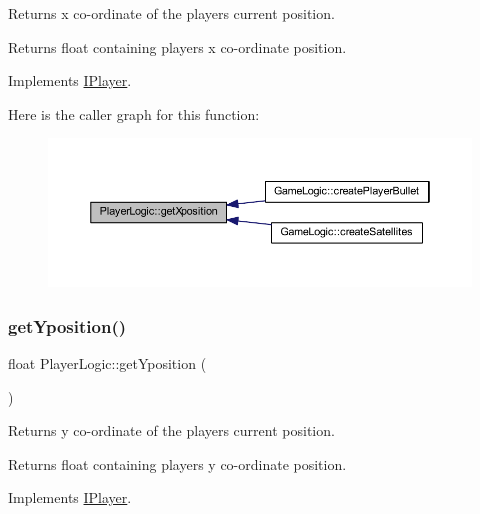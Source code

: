 Returns x co-\/ordinate of the player\textquotesingle{}s current position. 

\begin{DoxyReturn}{Returns}
float containing players x co-\/ordinate position. 
\end{DoxyReturn}


Implements \hyperlink{class_i_player_a9df96a1fd43f35f2579e2ec4a167acfe}{I\+Player}.

Here is the caller graph for this function\+:\nopagebreak
\begin{figure}[H]
\begin{center}
\leavevmode
\includegraphics[width=350pt]{class_player_logic_a9f92defe2d43690329bd6e334fb61e01_icgraph}
\end{center}
\end{figure}
\mbox{\label{class_player_logic_a58d683bde5ee078f3b21897f2a5f4677}} 
\subsubsection{\texorpdfstring{get\+Yposition()}{getYposition()}}
{\footnotesize\ttfamily float Player\+Logic\+::get\+Yposition (\begin{DoxyParamCaption}{ }\end{DoxyParamCaption})\hspace{0.3cm}{\ttfamily [virtual]}}



Returns y co-\/ordinate of the player\textquotesingle{}s current position. 

\begin{DoxyReturn}{Returns}
float containing players y co-\/ordinate position. 
\end{DoxyReturn}


Implements \hyperlink{class_i_player_af72407abf2418dd9c1df50f29d51f0ef}{I\+Player}.


